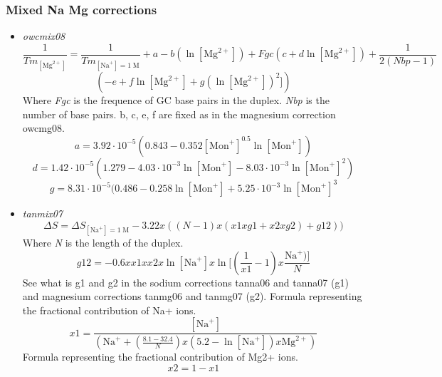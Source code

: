 \documentclass{article}
\begin{document}
\subsubsection{Mixed Na Mg corrections} 
 \begin{itemize}
 \item \textit{owcmix08}
 \begin{displaymath}
 \frac{1}{Tm_{[\mbox{Mg}^{2+}]}} = \frac{1}{Tm_{[\mbox{Na}^+]=1\;\mathrm{M}}} + a
 - b (\ln [\mbox{Mg}^{2+}]) + Fgc (c + d \ln [\mbox{Mg}^{2+}]) + \frac{1}{2 (Nbp-1)} 
 \end{displaymath}
 \begin{displaymath}
 (-e + f \ln [\mbox{Mg}^{2+}] + g (\ln [\mbox{Mg}^{2+}])^{2}])
 \end{displaymath}
 Where \emph{Fgc} is the frequence of GC base pairs in the duplex.
 \emph{Nbp} is the number of base pairs.
 b, c, e, f are fixed as in the magnesium correction owcmg08.
 \begin{displaymath}
 a = 3.92\cdot{}10^{-5} (0.843 - 0.352 [\mbox{Mon}^+]^{0.5} \ln [\mbox{Mon}^+]) 
 \end{displaymath}
 \begin{displaymath}
 d = 1.42\cdot{}10^{-5} (1.279 - 4.03\cdot{}10^{-3} \ln [\mbox{Mon}^+] -
 8.03\cdot{}10^{-3} \ln [\mbox{Mon}^+]^{2})
 \end{displaymath}
 \begin{displaymath}
 g = 8.31\cdot{}10^{-5} (0.486 - 0.258 \ln [\mbox{Mon}^+] + 5.25\cdot{}10^{-3}
 \ln [\mbox{Mon}^+]^{3} 
 \end{displaymath}
 \item \textit{tanmix07}
 \begin{displaymath}
 \Delta{}S=\Delta{}S_{[\mbox{Na}^+]=1\;\mathrm{M}}- 3.22 x ((N - 1) x (x1 x g1 + x2 x g2) + g12))  
 \end{displaymath}
 Where \emph{N} is the length of the duplex.
 \begin{displaymath}
  g12 = -0.6 x x1 x x2 x \ln [\mbox{Na}^+] x \ln [(\frac{1}{x1} - 1) x \frac{\mbox{Na}^+)]}{N}  
 \end{displaymath}
  See what is g1 and g2 in the sodium corrections tanna06 and tanna07 (g1) and
  magnesium corrections tanmg06 and tanmg07 (g2).
  Formula representing the fractional contribution of Na+ ions.
 \begin{displaymath}
  x1 = \frac{[\mbox{Na}^+]}{(\mbox{Na}^+ + (\frac{8.1 - 32.4}{N}) x (5.2 - \ln [\mbox{Na}^+]) x \mbox{Mg}^{2+})}  
 \end{displaymath}
 Formula representing the fractional contribution of Mg2+ ions.
 \begin{displaymath}
  x2= 1-x1  
 \end{displaymath}
 \end{itemize}
\end{document}

